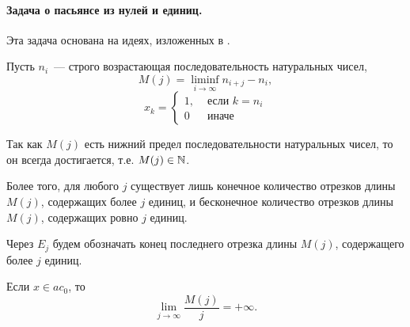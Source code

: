 \paragraph{Задача о пасьянсе из нулей и единиц.}

Эта задача основана на идеях, изложенных в \cite[\S 5]{Semenov2014geomprops}.

Пусть $n_i$~--- строго возрастающая последовательность натуральных чисел,
\begin{equation}
	\label{eq:definition_M_j}
	M(j) = \liminf_{i\to\infty} n_{i+j} - n_i,
\end{equation}
\begin{equation}
	x_k = \left\{\begin{array}{ll}
		1, & \mbox{~если~} k = n_i
		\\
		0  & \mbox{~иначе~}
	\end{array}\right.
\end{equation}

Так как $M(j)$ есть нижний предел последовательности натуральных чисел,
то он всегда достигается,
т.е. $M(j)\in\mathbb{N}$.

Более того, для любого $j$ существует лишь конечное количество отрезков длины $M(j)$,
содержащих более $j$ единиц,
и бесконечное количество отрезков длины $M(j)$,
содержащих ровно $j$ единиц.

Через $E_j$ будем обозначать конец последнего отрезка длины $M(j)$,
содержащего более $j$ единиц.

\begin{lemma}
	\label{thm:lim_M(j)/j_neobh}
	Если $x \in ac_0$, то
	\begin{equation}\label{lim_M(j)/j}
		\lim_{j \to \infty} \frac{M(j)}{j} = +\infty
		.
	\end{equation}
\end{lemma}

